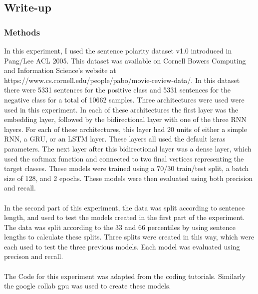 \documentclass[12pt]{article}
\begin{document}
\subsection{Write-up}
\subsubsection{Methods}
In this experiment, I used the sentence polarity dataset v1.0 introduced in Pang/Lee ACL 2005. This dataset was available on Cornell Bowers Computing and Information Science's website at https://www.cs.cornell.edu/people/pabo/movie-review-data/. In this dataset there were 5331 sentences for the positive class and 5331 sentences for the negative class for a total of 10662 samples. Three architectures were used were used in this experiment. In each of these architectures the first layer was the embedding layer, followed by the bidirectional layer with one of the three RNN layers. For each of these architectures, this layer had 20 units of either a simple RNN, a GRU, or an LSTM layer. These layers all used the default keras parameters. The next layer after this bidirectional layer was a dense layer, which used the softmax function and connected to two final vertices representing the target classes. These models were trained using a 70/30 train/test split, a batch size of 128, and 2 epochs. These models were then evaluated using both precision and recall.\\
\\
In the second part of this experiment, the data was split according to sentence length, and used to test the models created in the first part of the experiment. The data was split according to the 33 and 66 percentiles by using sentence lengths to calculate these splits. Three splits were created in this way, which were each used to test the three previous models. Each model was evaluated using precison and recall.\\
\\
The Code for this experiment was adapted from the coding tutorials. Similarly the google collab gpu was used to create these models.
\end{document}
